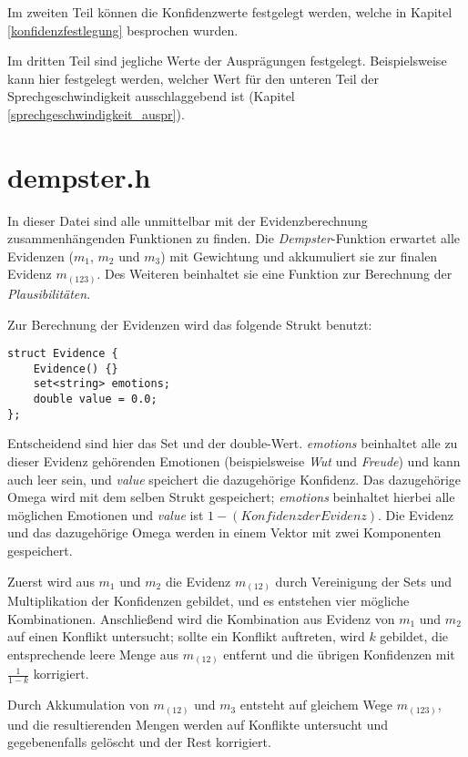Im zweiten Teil können die Konfidenzwerte festgelegt werden, welche in Kapitel \ref{konfidenzfestlegung} besprochen wurden.

Im dritten Teil sind jegliche Werte der Ausprägungen festgelegt. Beispielsweise kann hier festgelegt werden, welcher Wert für den unteren Teil der Sprechgeschwindigkeit ausschlaggebend ist (Kapitel \ref{sprechgeschwindigkeit_auspr}).

\section{dempster.h}
In dieser Datei sind alle unmittelbar mit der Evidenzberechnung zusammenhängenden Funktionen zu finden. Die \textit{Dempster}-Funktion erwartet alle Evidenzen (\(m_1\), \(m_2\) und \(m_3\)) mit Gewichtung und akkumuliert sie zur finalen Evidenz \(m_(123)\). Des Weiteren beinhaltet sie eine Funktion zur Berechnung der \textit{Plausibilitäten}.

Zur Berechnung der Evidenzen wird das folgende Strukt benutzt:

\begin{lstlisting}[caption=Strukt zur Evidenzberechnung, label=structcode]
struct Evidence {
	Evidence() {}
	set<string> emotions;
	double value = 0.0;
};
\end{lstlisting}

Entscheidend sind hier das Set und der double-Wert. \textit{emotions} beinhaltet alle zu dieser Evidenz gehörenden Emotionen (beispielsweise \textit{Wut} und \textit{Freude}) und kann auch leer sein, und \textit{value} speichert die dazugehörige Konfidenz. Das dazugehörige Omega wird mit dem selben Strukt gespeichert; \textit{emotions} beinhaltet hierbei alle möglichen Emotionen und \textit{value} ist \(1 - (Konfidenz der Evidenz)\). Die Evidenz und das dazugehörige Omega werden in einem Vektor mit zwei Komponenten gespeichert.

Zuerst wird aus \(m_1\) und \(m_2\) die Evidenz \(m_(12)\) durch Vereinigung der Sets und Multiplikation der Konfidenzen gebildet, und es entstehen vier mögliche Kombinationen. Anschließend wird die Kombination aus Evidenz von \(m_1\) und \(m_2\) auf einen Konflikt untersucht; sollte ein Konflikt auftreten, wird \(k\) gebildet, die entsprechende leere Menge aus \(m_(12)\) entfernt und die übrigen Konfidenzen mit \(\frac{1}{1-k}\) korrigiert.

Durch Akkumulation von \(m_(12)\) und \(m_3\) entsteht auf gleichem Wege \(m_(123)\), und die resultierenden Mengen werden auf Konflikte untersucht und gegebenenfalls gelöscht und der Rest korrigiert. 
 
